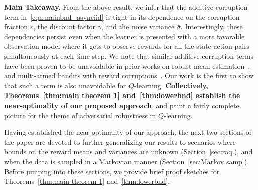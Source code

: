 \documentclass{article}
\begin{document}
\textbf{Main Takeaway.} From the above result, we infer that the additive corruption term in~\eqref{eqn:mainbnd_asynciid} is tight in its dependence on the corruption fraction $\varepsilon$, the discount factor $\gamma$, and the noise variance $\bar{\sigma}$. Interestingly, these dependencies persist even when the learner is presented with a more favorable observation model where it gets to observe rewards for all the state-action pairs simultaneously at each time-step. We note that similar additive corruption terms have been proven to be unavoidable in prior works on robust mean estimation~\citep{chenrobust, lai, cheng, Dalal2}, and multi-armed bandits with reward corruptions~\citep{lykouris, guptaadv, kapoor}. Our work is the first to show that such a term is also unavoidable for \(Q\)-learning. \textbf{Collectively, Theorems~\ref{thm:main theorem 1} and~\ref{thm:lowerbnd} establish the near-optimality of our proposed approach}, and paint a fairly complete picture for the theme of adversarial robustness in \(Q\)-learning. 

Having established the near-optimality of our approach, the next two sections of the paper are devoted to further generalizing our results to scenarios where bounds on the reward means and variances are unknown (Section~\ref{sec:raq}), and when the data is sampled in a Markovian manner (Section~\ref{sec:Markov samp}). Before jumping into these sections, we provide brief proof sketches for Theorems~\ref{thm:main theorem 1} and~\ref{thm:lowerbnd}.  
\end{document}
